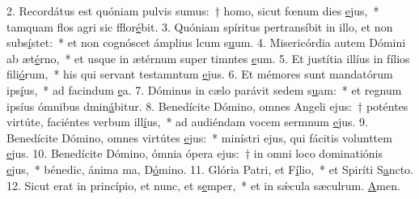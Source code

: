 2. Recordátus est quóniam pulvis sumus:~† homo, sicut fœnum dies \uline{e}jus,~* tamquam flos agri sic fflor\uline{é}bit.
3. Quóniam spíritus pertransíbit in illo, et non subs\uline{í}stet:~* et non cognóscet ámplius lcum s\uline{u}um.
4. Misericórdia autem Dómini ab æt\uline{é}rno,~* et usque in ætérnum super timntes \uline{e}um.
5. Et justítia illíus in fílios fili\uline{ó}rum,~* his qui servant testamntum \uline{e}jus.
6. Et mémores sunt mandatórum ips\uline{í}us,~* ad facindum \uline{e}a.
7. Dóminus in cælo parávit sedem s\uline{u}am:~* et regnum ipsíus ómnibus dmin\uline{á}bitur.
8. Benedícite Dómino, omnes Angeli ejus:~† poténtes virtúte, faciéntes verbum ill\uline{í}us,~* ad audiéndam vocem sermnum \uline{e}jus.
9. Benedícite Dómino, omnes virtútes \uline{e}jus:~* minístri ejus, qui fácitis volunttem \uline{e}jus.
10. Benedícite Dómino, ómnia ópera ejus:~† in omni loco dominatiónis \uline{e}jus,~* bénedic, ánima ma, D\uline{ó}mino.
11. Glória Patri, et F\uline{í}lio,~* et Spiríti S\uline{a}ncto.
12. Sicut erat in princípio, et nunc, et s\uline{e}mper,~* et in sǽcula sæculrum. \uline{A}men.
